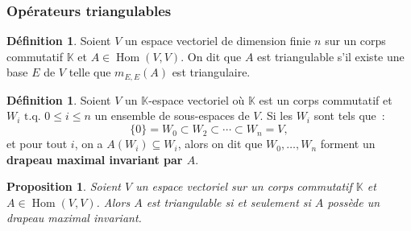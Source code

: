 \documentclass{article}
\DeclareMathOperator{\Hom}{Hom}
\newcommand{\K}{\mathbb K}
\newcommand{\tq}{\textrm{ t.q. }}
\newtheorem{prp}[thm]{Proposition}
\theoremstyle{definition}
\newtheorem{déf}[thm]{Définition}
\theoremstyle{remark}
\begin{document}
		\subsubsection{Opérateurs triangulables}
		\begin{déf} Soient $V$ un espace vectoriel de dimension finie $n$ sur un corps commutatif $\K$ et $A \in \Hom(V, V)$. On dit que $A$ est triangulable
		s'il existe une base $E$ de $V$ telle que $m_{E, E}(A)$ est triangulaire. \end{déf}

		\begin{déf} Soient $V$ un $\K$-espace vectoriel où $\K$ est un corps commutatif et ${W_i \tq 0 \leq i \leq n}$ un ensemble de sous-espaces de $V$.
		Si les $W_i$ sont tels que~:
		\[\{0\} = W_0 \subset W_2 \subset \dotsb \subset W_n = V,\]
		et pour tout $i$, on a $A(W_i) \subseteq W_i$, alors on dit que $W_0, \dotsc, W_n$ forment un \textbf{drapeau maximal invariant par $A$}. \end{déf}

		\begin{prp} Soient $V$ un espace vectoriel sur un corps commutatif $\K$ et $A \in \Hom(V, V)$. Alors $A$ est triangulable si et seulement si
		$A$ possède un drapeau maximal invariant. \end{prp}
\end{document}
